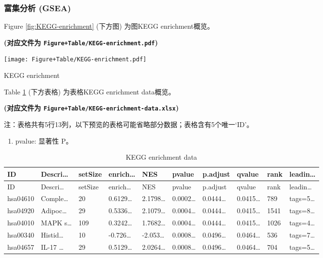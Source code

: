 \documentclass[
]{article}
\providecommand{\tightlist}{%
  \setlength{\itemsep}{0pt}\setlength{\parskip}{0pt}}
\begin{document}
\hypertarget{ux5bccux96c6ux5206ux6790-gsea}{%
\subsubsection{富集分析 (GSEA)}\label{ux5bccux96c6ux5206ux6790-gsea}}

Figure \ref{fig:KEGG-enrichment} (下方图) 为图KEGG enrichment概览。

\textbf{(对应文件为 \texttt{Figure+Table/KEGG-enrichment.pdf})}

\def\@captype{figure}
\begin{center}
\texttt{[image: Figure+Table/KEGG-enrichment.pdf]}
\caption{KEGG enrichment}\label{fig:KEGG-enrichment}
\end{center}

Table \ref{tab:KEGG-enrichment-data} (下方表格) 为表格KEGG enrichment data概览。

\textbf{(对应文件为 \texttt{Figure+Table/KEGG-enrichment-data.xlsx})}

\begin{center}\begin{tcolorbox}[colback=gray!10, colframe=gray!50, width=0.9\linewidth, arc=1mm, boxrule=0.5pt]注：表格共有5行13列，以下预览的表格可能省略部分数据；表格含有5个唯一`ID'。
\end{tcolorbox}
\end{center}
\begin{center}\begin{tcolorbox}[colback=gray!10, colframe=gray!50, width=0.9\linewidth, arc=1mm, boxrule=0.5pt]\begin{enumerate}\tightlist
\item pvalue:  显著性 P。
\end{enumerate}\end{tcolorbox}
\end{center}

\begin{longtable}[]{@{}llllllllll@{}}
\caption{\label{tab:KEGG-enrichment-data}KEGG enrichment data}\tabularnewline
\toprule
ID & Descri\ldots{} & setSize & enrich\ldots{} & NES & pvalue & p.adjust & qvalue & rank & leadin\ldots{}\tabularnewline
\midrule
\endfirsthead
\toprule
ID & Descri\ldots{} & setSize & enrich\ldots{} & NES & pvalue & p.adjust & qvalue & rank & leadin\ldots{}\tabularnewline
\midrule
\endhead
hsa04610 & Comple\ldots{} & 20 & 0.6129\ldots{} & 2.1798\ldots{} & 0.0002\ldots{} & 0.0444\ldots{} & 0.0415\ldots{} & 789 & tags=5\ldots{}\tabularnewline
hsa04920 & Adipoc\ldots{} & 29 & 0.5336\ldots{} & 2.1079\ldots{} & 0.0004\ldots{} & 0.0444\ldots{} & 0.0415\ldots{} & 1541 & tags=8\ldots{}\tabularnewline
hsa04010 & MAPK s\ldots{} & 109 & 0.3242\ldots{} & 1.7682\ldots{} & 0.0004\ldots{} & 0.0444\ldots{} & 0.0415\ldots{} & 1026 & tags=4\ldots{}\tabularnewline
hsa00340 & Histid\ldots{} & 10 & -0.726\ldots{} & -2.053\ldots{} & 0.0008\ldots{} & 0.0496\ldots{} & 0.0464\ldots{} & 536 & tags=7\ldots{}\tabularnewline
hsa04657 & IL-17 \ldots{} & 29 & 0.5129\ldots{} & 2.0264\ldots{} & 0.0008\ldots{} & 0.0496\ldots{} & 0.0464\ldots{} & 704 & tags=5\ldots{}\tabularnewline
\bottomrule
\end{longtable}
\end{document}
